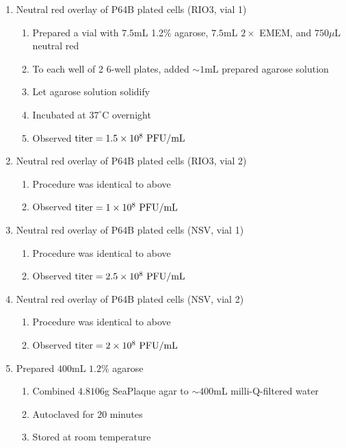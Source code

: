 \begin{enumerate}
	\item Neutral red overlay of P64B plated cells (RIO3, vial 1)
		\begin{enumerate}
			\item Prepared a vial with $7.5$mL 1.2\% agarose, $7.5$mL $2\times$ EMEM, and $750\mu$L neutral red
			\item To each well of 2 6-well plates, added $\sim 1$mL prepared agarose solution
			\item Let agarose solution solidify
			\item Incubated at $37^{\circ}$C overnight
			\item Observed $\text{titer}=1.5\times 10^{8}\text{ PFU/mL}$
		\end{enumerate}
	\item Neutral red overlay of P64B plated cells (RIO3, vial 2)
		\begin{enumerate}
			\item Procedure was identical to above
			\item Observed $\text{titer}=1\times 10^{8}\text{ PFU/mL}$
		\end{enumerate}
	\item Neutral red overlay of P64B plated cells (NSV, vial 1)
		\begin{enumerate}
			\item Procedure was identical to above
			\item Observed $\text{titer}=2.5\times 10^{8}\text{ PFU/mL}$
		\end{enumerate}
	\item Neutral red overlay of P64B plated cells (NSV, vial 2)
		\begin{enumerate}
			\item Procedure was identical to above
			\item Observed $\text{titer}=2\times 10^{8}\text{ PFU/mL}$
		\end{enumerate}
	\item Prepared $400$mL $1.2$\% agarose
		\begin{enumerate}
			\item Combined $4.8106$g SeaPlaque agar to $\sim 400$mL milli-Q-filtered water
			\item Autoclaved for $20$ minutes
			\item Stored at room temperature
		\end{enumerate}
\end{enumerate}


